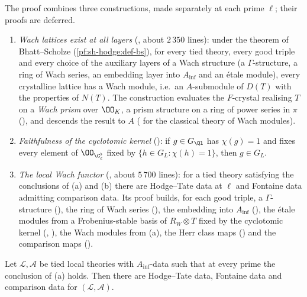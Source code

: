 The proof combines three constructions, made separately at each prime $\ell$; their proofs are deferred.
\begin{enumerate}[label=(\alph*)]
\item \emph{Wach lattices exist at all layers} (, about $2\,350$ lines):
  under the theorem of Bhatt--Scholze (\cref{pf:sh-hodge:def-bs}), for every tied theory, every good triple and every choice of the auxiliary
  layers of a
  Wach structure (a $\Gamma$-structure, a ring of Wach series, an embedding layer into $A_{\inf}$ and an \'etale module), every crystalline
  lattice has a Wach module, i.e.\ an $A$-submodule of $D(T)$ with the properties of $N(T)$. The construction evaluates the $F$-crystal realising
  $T$ on a \emph{Wach prism} over $\OO_K$, a prism structure on a ring of power series in $\pi$
  (), and descends the result to $A$ (\cite{Wach1996,Berger2004} for the classical
  theory of Wach modules).
\item \emph{Faithfulness of the cyclotomic kernel} (): if $g\in G_{\Ql}$ has
  $\chi(g)=1$ and fixes every element of $\OO_{\C_\ell^\flat}$ fixed by $\{h\in G_L:\chi(h)=1\}$, then $g\in G_L$.
\item \emph{The local Wach functor} (, about $5\,700$ lines): for a tied theory satisfying the
  conclusions of (a) and (b) there are Hodge--Tate data at $\ell$ and Fontaine data admitting comparison data. Its proof builds, for each good
  triple, a $\Gamma$-structure (), the ring of Wach series
  (), the embedding into $A_{\inf}$ (), the \'etale modules
  from a Frobenius-stable basis of $R_W\otimes T$ fixed by the cyclotomic kernel (,
  ), the Wach modules from (a), the Herr class maps
  () and the comparison maps ().
\end{enumerate}

\begin{lemma}\label{pf:sh-hodge:exhw-lem}
Let $\mathcal L,\mathcal A$ be tied local theories with $A_{\inf}$-data such that at every prime the conclusion of (a) holds. Then there are Hodge--Tate data,
Fontaine data and comparison data for $(\mathcal L,\mathcal A)$.
\end{lemma}

